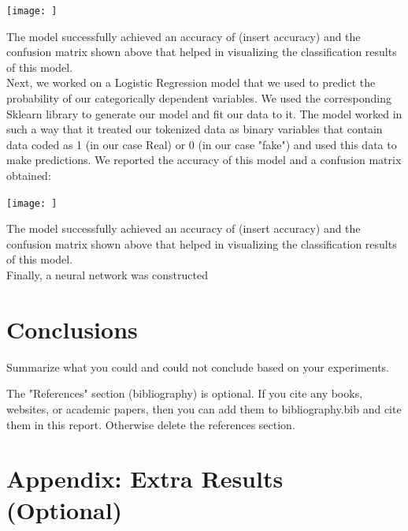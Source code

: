 \documentclass[10pt,twocolumn,letterpaper]{article}
\begin{document}
\begin{center}
\texttt{[image: ]}
\end{center}

The model successfully achieved an accuracy of (insert accuracy) and the confusion matrix shown above that helped in visualizing the classification results of this model.\\ 

Next, we worked on a Logistic Regression model that we used to predict the probability of our categorically dependent variables. We used the corresponding Sklearn library to generate our model and fit our data to it. The model worked in such a way that it treated our tokenized data as binary variables that contain data coded as 1 (in our case Real) or 0 (in our case "fake") and used this data to make predictions. We reported the accuracy of this model and a confusion matrix obtained: 

\begin{center}
\texttt{[image: ]}
\end{center}

The model successfully achieved an accuracy of (insert accuracy) and the confusion matrix shown above that helped in visualizing the classification results of this model.\\ 

Finally, a neural network was constructed 

\section{Conclusions}

Summarize what you could and could not conclude based on your experiments.

The "References" section (bibliography) is optional. If you cite any books, websites, or academic papers, then you can add them to bibliography.bib and cite them in this report. Otherwise delete the references section.


{\small


}


\newpage
\appendix


\section*{Appendix: Extra Results (Optional)}
\end{document}
